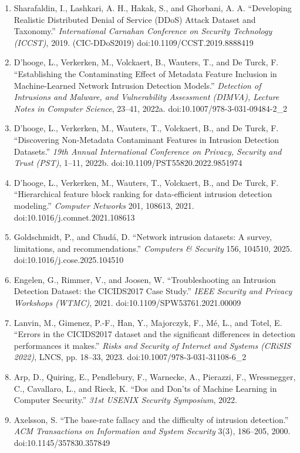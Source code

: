 \documentclass[11pt,a4paper]{article}
\begin{document}
\begin{enumerate}[leftmargin=*,itemsep=2pt]
\item Sharafaldin, I., Lashkari, A. H., Hakak, S., and Ghorbani, A. A. ``Developing Realistic Distributed Denial of Service (DDoS) Attack Dataset and Taxonomy.'' \emph{International Carnahan Conference on Security Technology (ICCST)}, 2019. (CIC-DDoS2019) doi:10.1109/CCST.2019.8888419
\item D'hooge, L., Verkerken, M., Volckaert, B., Wauters, T., and De Turck, F. ``Establishing the Contaminating Effect of Metadata Feature Inclusion in Machine-Learned Network Intrusion Detection Models.'' \emph{Detection of Intrusions and Malware, and Vulnerability Assessment (DIMVA), Lecture Notes in Computer Science}, 23--41, 2022a. doi:10.1007/978-3-031-09484-2\_2
\item D'hooge, L., Verkerken, M., Wauters, T., Volckaert, B., and De Turck, F. ``Discovering Non-Metadata Contaminant Features in Intrusion Detection Datasets.'' \emph{19th Annual International Conference on Privacy, Security and Trust (PST)}, 1--11, 2022b. doi:10.1109/PST55820.2022.9851974
\item D'hooge, L., Verkerken, M., Wauters, T., Volckaert, B., and De Turck, F. ``Hierarchical feature block ranking for data-efficient intrusion detection modeling.'' \emph{Computer Networks} 201, 108613, 2021. doi:10.1016/j.comnet.2021.108613
\item Goldschmidt, P., and Chudá, D. ``Network intrusion datasets: A survey, limitations, and recommendations.'' \emph{Computers \& Security} 156, 104510, 2025. doi:10.1016/j.cose.2025.104510
\item Engelen, G., Rimmer, V., and Joosen, W. ``Troubleshooting an Intrusion Detection Dataset: the CICIDS2017 Case Study.'' \emph{IEEE Security and Privacy Workshops (WTMC)}, 2021. doi:10.1109/SPW53761.2021.00009
\item Lanvin, M., Gimenez, P.-F., Han, Y., Majorczyk, F., Mé, L., and Totel, E. ``Errors in the CICIDS2017 dataset and the significant differences in detection performances it makes.'' \emph{Risks and Security of Internet and Systems (CRiSIS 2022)}, LNCS, pp. 18--33, 2023. doi:10.1007/978-3-031-31108-6\_2
\item Arp, D., Quiring, E., Pendlebury, F., Warnecke, A., Pierazzi, F., Wressnegger, C., Cavallaro, L., and Rieck, K. ``Dos and Don'ts of Machine Learning in Computer Security.'' \emph{31st USENIX Security Symposium}, 2022.
\item Axelsson, S. ``The base-rate fallacy and the difficulty of intrusion detection.'' \emph{ACM Transactions on Information and System Security} 3(3), 186--205, 2000. doi:10.1145/357830.357849

\end{enumerate}
\end{document}
